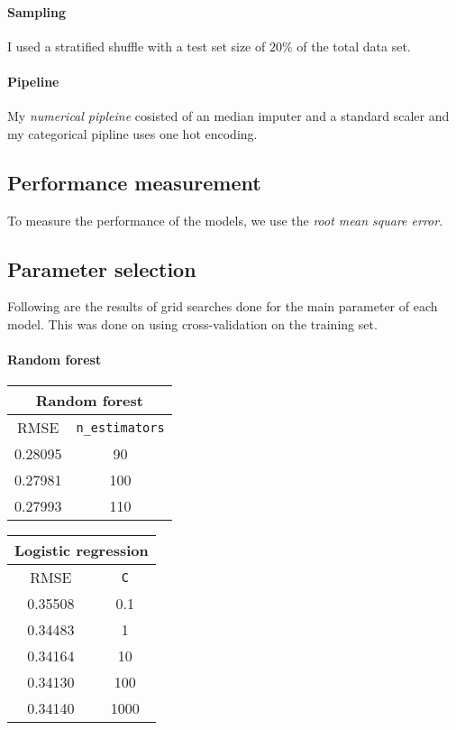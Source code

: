 \documentclass[a4paper]{article}
\begin{document}
\paragraph{Sampling}

I used a stratified shuffle with a test set size of $20\%$ of the total data set.

\paragraph{Pipeline}
My \emph{numerical pipleine} cosisted of an median imputer and a standard scaler
and my categorical pipline uses one hot encoding.

\subsection{Performance measurement}

To measure the performance of the models, we use
the \emph{root mean square error}.

\subsection{Parameter selection}

Following are the results of grid searches done for the main
parameter of each model.
This was done on using cross-validation on the training set.

\paragraph{Random forest}
\begin{center}
    \begin{tabular}{cc}
        \toprule
        \multicolumn{2}{c}{Random forest} \\
        \midrule
        RMSE & \texttt{n\_estimators} \\
        \midrule
        0.28095 & 90 \\
        0.27981 & 100 \\ 
        0.27993 & 110 \\
        \bottomrule
    \end{tabular}
    \hspace{5em}
    \begin{tabular}{cc}
        \toprule
        \multicolumn{2}{c}{Logistic regression} \\
        \midrule
        RMSE & \texttt{C} \\
        \midrule
        0.35508 & 0.1 \\
        0.34483 & 1 \\ 
        0.34164 & 10 \\
        0.34130 & 100 \\
        0.34140 & 1000 \\
        \bottomrule
    \end{tabular}
\end{center}
\end{document}
